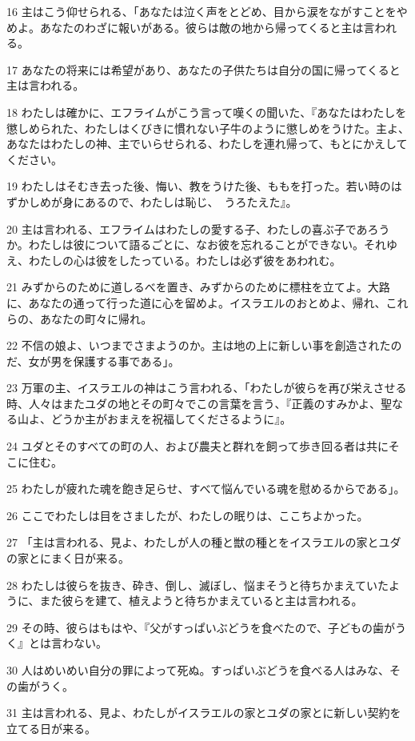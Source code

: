\par 16 主はこう仰せられる、「あなたは泣く声をとどめ、目から涙をながすことをやめよ。あなたのわざに報いがある。彼らは敵の地から帰ってくると主は言われる。
\par 17 あなたの将来には希望があり、あなたの子供たちは自分の国に帰ってくると主は言われる。
\par 18 わたしは確かに、エフライムがこう言って嘆くの聞いた、『あなたはわたしを懲しめられた、わたしはくびきに慣れない子牛のように懲しめをうけた。主よ、あなたはわたしの神、主でいらせられる、わたしを連れ帰って、もとにかえしてください。
\par 19 わたしはそむき去った後、悔い、教をうけた後、ももを打った。若い時のはずかしめが身にあるので、わたしは恥じ、　うろたえた』。
\par 20 主は言われる、エフライムはわたしの愛する子、わたしの喜ぶ子であろうか。わたしは彼について語るごとに、なお彼を忘れることができない。それゆえ、わたしの心は彼をしたっている。わたしは必ず彼をあわれむ。
\par 21 みずからのために道しるべを置き、みずからのために標柱を立てよ。大路に、あなたの通って行った道に心を留めよ。イスラエルのおとめよ、帰れ、これらの、あなたの町々に帰れ。
\par 22 不信の娘よ、いつまでさまようのか。主は地の上に新しい事を創造されたのだ、女が男を保護する事である」。
\par 23 万軍の主、イスラエルの神はこう言われる、「わたしが彼らを再び栄えさせる時、人々はまたユダの地とその町々でこの言葉を言う、『正義のすみかよ、聖なる山よ、どうか主がおまえを祝福してくださるように』。
\par 24 ユダとそのすべての町の人、および農夫と群れを飼って歩き回る者は共にそこに住む。
\par 25 わたしが疲れた魂を飽き足らせ、すべて悩んでいる魂を慰めるからである」。
\par 26 ここでわたしは目をさましたが、わたしの眠りは、ここちよかった。
\par 27 「主は言われる、見よ、わたしが人の種と獣の種とをイスラエルの家とユダの家とにまく日が来る。
\par 28 わたしは彼らを抜き、砕き、倒し、滅ぼし、悩まそうと待ちかまえていたように、また彼らを建て、植えようと待ちかまえていると主は言われる。
\par 29 その時、彼らはもはや、『父がすっぱいぶどうを食べたので、子どもの歯がうく』とは言わない。
\par 30 人はめいめい自分の罪によって死ぬ。すっぱいぶどうを食べる人はみな、その歯がうく。
\par 31 主は言われる、見よ、わたしがイスラエルの家とユダの家とに新しい契約を立てる日が来る。
